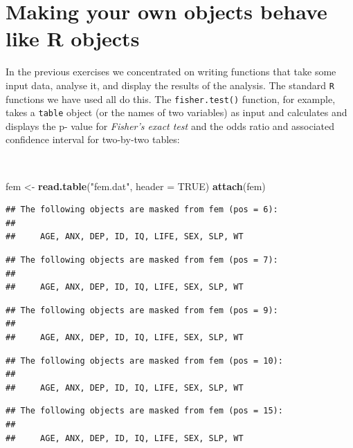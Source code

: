 \documentclass[12pt,a4paper]{book}
\newenvironment{Shaded}{\begin{snugshade}}{\end{snugshade}}
\newcommand{\KeywordTok}[1]{\textcolor[rgb]{0.13,0.29,0.53}{\textbf{#1}}}
\newcommand{\DataTypeTok}[1]{\textcolor[rgb]{0.13,0.29,0.53}{#1}}
\newcommand{\StringTok}[1]{\textcolor[rgb]{0.31,0.60,0.02}{#1}}
\newcommand{\OtherTok}[1]{\textcolor[rgb]{0.56,0.35,0.01}{#1}}
\newcommand{\NormalTok}[1]{#1}
\theoremstyle{definition}
\theoremstyle{definition}
\theoremstyle{definition}
\theoremstyle{remark}
\begin{document}
\hypertarget{exercise6}{%
\chapter{Making your own objects behave like R
objects}\label{exercise6}}

In the previous exercises we concentrated on writing functions that take
some input data, analyse it, and display the results of the analysis.
The standard \texttt{R} functions we have used all do this. The
\texttt{fisher.test()} function, for example, takes a \texttt{table}
object (or the names of two variables) as input and calculates and
displays the p- value for \emph{Fisher's exact test} and the odds ratio
and associated confidence interval for two-by-two tables:

~

\begin{Shaded}
\begin{Highlighting}[]
\NormalTok{fem <-}\StringTok{ }\KeywordTok{read.table}\NormalTok{(}\StringTok{"fem.dat"}\NormalTok{, }\DataTypeTok{header =} \OtherTok{TRUE}\NormalTok{)}
\KeywordTok{attach}\NormalTok{(fem)}
\end{Highlighting}
\end{Shaded}

\begin{verbatim}
## The following objects are masked from fem (pos = 6):
## 
##     AGE, ANX, DEP, ID, IQ, LIFE, SEX, SLP, WT
\end{verbatim}

\begin{verbatim}
## The following objects are masked from fem (pos = 7):
## 
##     AGE, ANX, DEP, ID, IQ, LIFE, SEX, SLP, WT
\end{verbatim}

\begin{verbatim}
## The following objects are masked from fem (pos = 9):
## 
##     AGE, ANX, DEP, ID, IQ, LIFE, SEX, SLP, WT
\end{verbatim}

\begin{verbatim}
## The following objects are masked from fem (pos = 10):
## 
##     AGE, ANX, DEP, ID, IQ, LIFE, SEX, SLP, WT
\end{verbatim}

\begin{verbatim}
## The following objects are masked from fem (pos = 15):
## 
##     AGE, ANX, DEP, ID, IQ, LIFE, SEX, SLP, WT
\end{verbatim}
\end{document}
